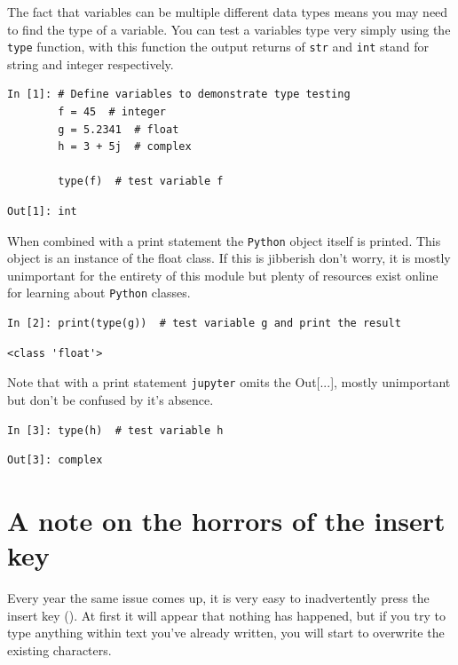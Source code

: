 \noindent The fact that variables can be multiple different data types means you may need to find the type of a variable. You can test a variables type very simply using the \texttt{type} function, with this function the output returns of \texttt{str} and \texttt{int} stand for string and integer respectively.
\begin{lstlisting}[style=PY]
In [1]: # Define variables to demonstrate type testing
        f = 45  # integer
        g = 5.2341  # float
        h = 3 + 5j  # complex
        
        type(f)  # test variable f
\end{lstlisting}
\begin{lstlisting}[style=PY, backgroundcolor=\color{white}]
Out[1]: int
\end{lstlisting}
\begin{tcolorbox}[colback=red!5!white,colframe=red!75!black]
When combined with a print statement the \texttt{Python} object itself is printed. This object is an instance of the float class. If this is jibberish don't worry, it is mostly unimportant for the entirety of this module but plenty of resources exist online for learning about \texttt{Python} classes.
\end{tcolorbox}
\begin{lstlisting}[style=PY]
In [2]: print(type(g))  # test variable g and print the result
\end{lstlisting}
\begin{lstlisting}[style=PY, backgroundcolor=\color{white}]
        <class 'float'>
\end{lstlisting}
Note that with a print statement \texttt{jupyter} omits the Out[...], mostly unimportant but don't be confused by it's absence.
\begin{lstlisting}[style=PY]
In [3]: type(h)  # test variable h
\end{lstlisting}
\begin{lstlisting}[style=PY, backgroundcolor=\color{white}]
Out[3]: complex
\end{lstlisting}

\section{A note on the horrors of the insert key}

Every year the same issue comes up, it is very easy to inadvertently press the insert key (). At first it will appear that nothing has happened, but if you try to type anything within text you've already written, you will start to overwrite the existing characters.


